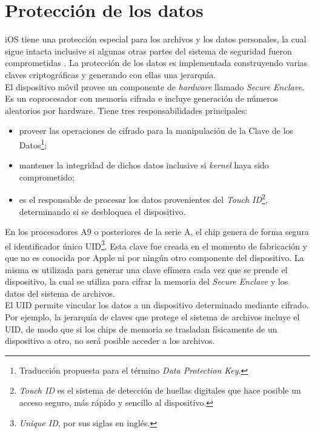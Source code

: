 \section{Protección de los datos} \label{fig:ch02:data-protection}
iOS tiene una protección especial para los archivos y los datos personales, la cual sigue intacta inclusive si algunas otras partes del sistema de seguridad fueron comprometidas \cite{asg}. La protección de los datos es implementada construyendo varias claves criptográficas y generando con ellas una jerarquía.\\
El dispositivo móvil provee un componente de \textit{hardware} llamado \textit{Secure Enclave}. Es un coprocesador con memoria cifrada e incluye generación de números aleatorios por hardware. Tiene tres responsabilidades principales:
\begin{itemize}
    \item proveer las operaciones de cifrado para la manipulación de la Clave de los Datos\footnote{Traducción propuesta para el término \textit{Data Protection Key}.};
    \item mantener la integridad de dichos datos inclusive si \textit{kernel} haya sido comprometido;
    \item es el responsable de procesar los datos provenientes del \textit{Touch ID}\footnote{\textit{Touch ID} es el sistema de detección de huellas digitales que hace posible un acceso seguro, más rápido y sencillo al dispositivo.}, determinando si se desbloquea el dispositivo.
\end{itemize}
En los procesadores A9 o posteriores de la serie A, el chip genera de forma segura el identificador único UID\footnote{\textit{Unique ID}, por sus siglas en inglés.}. Esta clave fue creada en el momento de fabricación y que no es conocida por Apple ni por ningún otro componente del dispositivo. La misma es utilizada para generar una clave efímera cada vez que se prende el dispositivo, la cual se utiliza para cifrar la memoria del \textit{Secure Enclave} y los datos del sistema de archivos.\\
El UID permite vincular los datos a un dispositivo determinado mediante cifrado. Por ejemplo, la jerarquía de claves que protege el sistema de archivos incluye el UID, de modo que si los chips de memoria se trasladan físicamente de un dispositivo a otro, no será posible acceder a los archivos.
